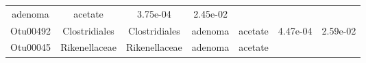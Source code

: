 \documentclass[11pt,]{article}
\begin{document}
\begin{longtable}[]{@{}ccccccc@{}}
\begin{minipage}[t]{0.09\columnwidth}
adenoma\strut
\end{minipage} & \begin{minipage}[t]{0.11\columnwidth}\centering\strut
acetate\strut
\end{minipage} & \begin{minipage}[t]{0.09\columnwidth}\centering\strut
3.75e-04\strut
\end{minipage} & \begin{minipage}[t]{0.09\columnwidth}\centering\strut
2.45e-02\strut
\end{minipage}\tabularnewline
\begin{minipage}[t]{0.09\columnwidth}\centering\strut
Otu00492\strut
\end{minipage} & \begin{minipage}[t]{0.17\columnwidth}\centering\strut
Clostridiales\strut
\end{minipage} & \begin{minipage}[t]{0.17\columnwidth}\centering\strut
Clostridiales\strut
\end{minipage} & \begin{minipage}[t]{0.09\columnwidth}\centering\strut
adenoma\strut
\end{minipage} & \begin{minipage}[t]{0.11\columnwidth}\centering\strut
acetate\strut
\end{minipage} & \begin{minipage}[t]{0.09\columnwidth}\centering\strut
4.47e-04\strut
\end{minipage} & \begin{minipage}[t]{0.09\columnwidth}\centering\strut
2.59e-02\strut
\end{minipage}\tabularnewline
\begin{minipage}[t]{0.09\columnwidth}\centering\strut
Otu00045\strut
\end{minipage} & \begin{minipage}[t]{0.17\columnwidth}\centering\strut
Rikenellaceae\strut
\end{minipage} & \begin{minipage}[t]{0.17\columnwidth}\centering\strut
Rikenellaceae\strut
\end{minipage} & \begin{minipage}[t]{0.09\columnwidth}\centering\strut
adenoma\strut
\end{minipage} & \begin{minipage}[t]{0.11\columnwidth}\centering\strut
acetate\strut
\end{minipage} & \begin{minipage}[t]{0.09\columnwidth}\centering\strut

\end{minipage}
\end{longtable}
\end{document}
